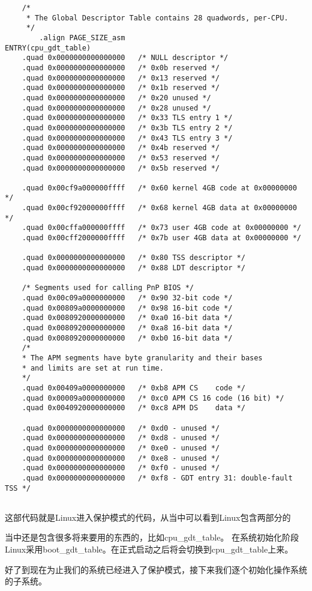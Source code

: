 \begin{lstlisting}
	/*
	 * The Global Descriptor Table contains 28 quadwords, per-CPU.
	 */
        .align PAGE_SIZE_asm
ENTRY(cpu_gdt_table)
	.quad 0x0000000000000000   /* NULL descriptor */
	.quad 0x0000000000000000   /* 0x0b reserved */
	.quad 0x0000000000000000   /* 0x13 reserved */
	.quad 0x0000000000000000   /* 0x1b reserved */
	.quad 0x0000000000000000   /* 0x20 unused */
	.quad 0x0000000000000000   /* 0x28 unused */
	.quad 0x0000000000000000   /* 0x33 TLS entry 1 */
	.quad 0x0000000000000000   /* 0x3b TLS entry 2 */
	.quad 0x0000000000000000   /* 0x43 TLS entry 3 */
	.quad 0x0000000000000000   /* 0x4b reserved */
	.quad 0x0000000000000000   /* 0x53 reserved */
	.quad 0x0000000000000000   /* 0x5b reserved */
	
	.quad 0x00cf9a000000ffff   /* 0x60 kernel 4GB code at 0x00000000 */
	.quad 0x00cf92000000ffff   /* 0x68 kernel 4GB data at 0x00000000 */
	.quad 0x00cffa000000ffff   /* 0x73 user 4GB code at 0x00000000 */
	.quad 0x00cff2000000ffff   /* 0x7b user 4GB data at 0x00000000 */
	
	.quad 0x0000000000000000   /* 0x80 TSS descriptor */
	.quad 0x0000000000000000   /* 0x88 LDT descriptor */
	
	/* Segments used for calling PnP BIOS */
	.quad 0x00c09a0000000000   /* 0x90 32-bit code */
	.quad 0x00809a0000000000   /* 0x98 16-bit code */
	.quad 0x0080920000000000   /* 0xa0 16-bit data */
	.quad 0x0080920000000000   /* 0xa8 16-bit data */
	.quad 0x0080920000000000   /* 0xb0 16-bit data */
	/*
	* The APM segments have byte granularity and their bases
	* and limits are set at run time.
	*/
	.quad 0x00409a0000000000   /* 0xb8 APM CS    code */
	.quad 0x00009a0000000000   /* 0xc0 APM CS 16 code (16 bit) */
	.quad 0x0040920000000000   /* 0xc8 APM DS    data */
	
	.quad 0x0000000000000000   /* 0xd0 - unused */
	.quad 0x0000000000000000   /* 0xd8 - unused */
	.quad 0x0000000000000000   /* 0xe0 - unused */
	.quad 0x0000000000000000   /* 0xe8 - unused */
	.quad 0x0000000000000000   /* 0xf0 - unused */
	.quad 0x0000000000000000   /* 0xf8 - GDT entry 31: double-fault TSS */
	
\end{lstlisting}
这部代码就是Linux进入保护模式的代码，从当中可以看到Linux包含两部分的

当中还是包含很多将来要用的东西的，比如cpu\_gdt\_table。 在系统初始化阶段Linux采用boot\_gdt\_table。在正式启动之后将会切换到cpu\_gdt\_table上来。

好了到现在为止我们的系统已经进入了保护模式，接下来我们逐个初始化操作系统的子系统。

